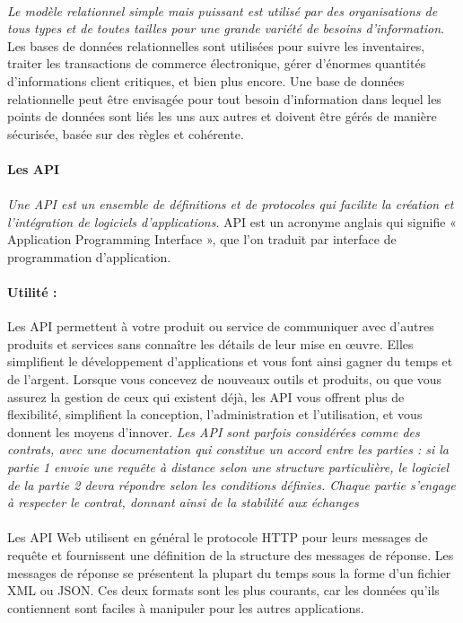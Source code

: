  \paragraph{}
 \textit{Le modèle relationnel simple mais puissant est utilisé par des organisations 
 de tous types et de toutes tailles pour une grande variété de besoins d'information}\cite{Oracle}.
  Les bases de données relationnelles sont utilisées pour suivre les inventaires, 
  traiter les transactions de commerce électronique, gérer d'énormes quantités d'informations
   client critiques, et bien plus encore. Une base de données relationnelle peut être envisagée 
   pour tout besoin d'information dans lequel les points de données sont liés les uns 
   aux autres et doivent être gérés de manière sécurisée, basée sur des règles et cohérente.

\paragraph{Les API}
\paragraph{}
\textit{Une API est un ensemble de définitions et de protocoles qui facilite la création et 
l'intégration de logiciels d'applications}\cite{RedHat}. API est un acronyme anglais qui signifie 
« Application Programming Interface », que l'on traduit par interface de programmation d'application.
\paragraph{Utilité :}
Les API permettent à votre produit ou service de communiquer avec d'autres produits et services 
sans connaître les détails de leur mise en œuvre. Elles simplifient le développement d'applications 
et vous font ainsi gagner du temps et de l'argent. Lorsque vous concevez de nouveaux outils et produits, 
ou que vous assurez la gestion de ceux qui existent déjà, les API vous offrent plus de flexibilité, 
simplifient la conception, l'administration et l'utilisation, et vous donnent les moyens d'innover.
\textit{Les API sont parfois considérées comme des contrats, avec une documentation qui constitue 
un accord entre les parties : si la partie 1 envoie une requête à distance selon une structure 
particulière, le logiciel de la partie 2 devra répondre selon les conditions définies. 
Chaque partie s’engage à respecter le contrat, donnant ainsi de la stabilité aux échanges}\cite{Alteva}
\paragraph{}
Les API Web utilisent en général le protocole HTTP pour leurs messages de requête et fournissent une 
définition de la structure des messages de réponse. Les messages de réponse se présentent 
la plupart du temps sous la forme d'un fichier XML ou JSON. Ces deux formats sont les plus courants, 
car les données qu'ils contiennent sont faciles à manipuler pour les autres applications.
